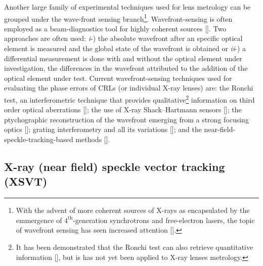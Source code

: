 \begin{refsection}
Another large family of experimental techniques used for lens metrology can be grouped under the wave-front sensing branch\footnote{With the advent of more coherent sources of X-rays as encapsulated by the emmergence of $4^{\text{th}}$-generation synchrotrons and free-electron lasers, the topic of wavefront sensing has seen increased attention [\cite{Seaberg2019}].}. Wavefront-sensing is often employed as a beam-diagnostics tool for highly coherent sources [\cite{Seaberg2019}]. Two approaches are often used: \textit{i}-) the absolute wavefront after an specific optical element is measured and the global state of the wavefront is obtained or \textit{ii}-) a differential measurement is done with and without the optical element under investigation, the differences in the wavefront attributed to the addition of the optical element under test. Current wavefront-sensing techniques used for evaluating the phase errors of CRLs (or individual X-ray lenses) are: the Ronchi test, an interferometric technique that provides qualitative\footnote{It has been demonstrated that the Ronchi test can also retrieve quantitative information [\cite{Lee2010}], but is has not yet been applied to X-ray lenses metrology.} information on third order optical aberrations [\cite{Nilsson2012, Uhlen2014}]; the use of X-ray Shack–Hartmann sensors [\cite{Mayo2004,Mikhaylov2020}]; the ptychographic reconstruction of the wavefront emerging from a strong focusing optics [\cite{Schropp2013,Sala2017,Seiboth2017}]; grating interferometry and all its variations [\cite{David2012,Koch2016,Grizolli2017}]; and the near-field-speckle-tracking-based methods [\cite{Berujon2013,Zdora2018,Berujon2020a}].

\subsection{X-ray (near field) speckle vector tracking (XSVT)}\label{sec:XSVT}%


\end{refsection}
